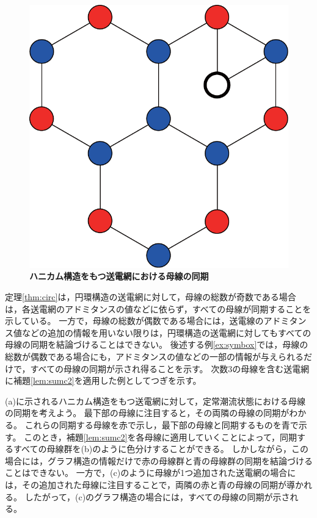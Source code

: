 \documentclass[tombow,dvipdfmx]{corona-a5-1.1}
\begin{document}
\begin{figure}[t]
{\begin{minipage}{0.3\linewidth}
    \centering
    \includegraphics[width = .70\linewidth]{figs/honyc}
    \subcaption{  }
  \end{minipage}
  \medskip
  \caption{\textbf{ハニカム構造をもつ送電網における母線の同期}}
  \label{fig:hony}
  }
\medskip
\end{figure}
定理\ref{thm:circ}は，円環構造の送電網に対して，母線の総数が奇数である場合は，各送電網のアドミタンスの値などに依らず，すべての母線が同期することを示している。
一方で，母線の総数が偶数である場合には，送電線のアドミタンス値などの追加の情報を用いない限りは，円環構造の送電網に対してもすべての母線の同期を結論づけることはできない。
後述する例\ref{ex:symbox}では，母線の総数が偶数である場合にも，アドミタンスの値などの一部の情報が与えられるだけで，すべての母線の同期が示され得ることを示す。
次数3の母線を含む送電網に補題\ref{lem:sumc2}を適用した例としてつぎを示す。

\begin{例}[ハニカム構造の送電網における母線の同期]\label{ex:deg3}
(a)に示されるハニカム構造をもつ送電網に対して，定常潮流状態における母線の同期を考えよう。
最下部の母線に注目すると，その両隣の母線の同期がわかる。
これらの同期する母線を赤で示し，最下部の母線と同期するものを青で示す。
このとき，補題\ref{lem:sumc2}を各母線に適用していくことによって，同期するすべての母線群を(b)のように色分けすることができる。
しかしながら，この場合には，グラフ構造の情報だけで赤の母線群と青の母線群の同期を結論づけることはできない。
一方で，(c)のように母線が1つ追加された送電網の場合には，その追加された母線に注目することで，両隣の赤と青の母線の同期が導かれる。
したがって，(c)のグラフ構造の場合には，すべての母線の同期が示される。
\end{例}
\end{document}
